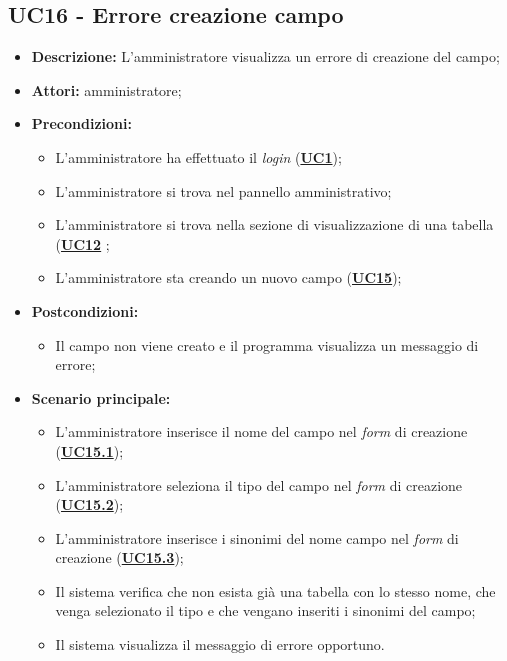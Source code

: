 \subsection{UC16 - Errore creazione campo}
\label{sec:UC16}
\begin{itemize}
	\item \textbf{Descrizione:} L’amministratore visualizza un errore di creazione del campo;
	\item \textbf{Attori:} amministratore;
	\item \textbf{Precondizioni:} 
	\begin{itemize}
		\item L’amministratore ha effettuato il \textit{login} (\hyperref[sec:UC1]{\textbf{UC1}});
		\item L’amministratore si trova nel pannello amministrativo;
		\item L’amministratore si trova nella sezione di visualizzazione di una tabella (\hyperref[sec:UC12]{\textbf{UC12}} ;
		\item L’amministratore sta creando un nuovo campo (\hyperref[sec:UC15]{\textbf{UC15}});
	\end{itemize}
	\item \textbf{Postcondizioni:} 
	\begin{itemize}
		\item Il campo non viene creato e il programma visualizza un messaggio di errore;
	\end{itemize}
	\item \textbf{Scenario principale:} 
	\begin{itemize}
		\item L’amministratore inserisce il nome del campo nel \textit{form} di creazione (\hyperref[sec:UC15.1]{\textbf{UC15.1}});
		\item L’amministratore seleziona il tipo del campo nel \textit{form} di creazione (\hyperref[sec:UC15.2]{\textbf{UC15.2}});
		\item L’amministratore inserisce i sinonimi del nome campo nel \textit{form} di creazione (\hyperref[sec:UC15.3]{\textbf{UC15.3}});
		\item Il sistema verifica che non esista già una tabella con lo stesso nome, che venga selezionato il tipo e che vengano inseriti i sinonimi del campo;
		\item Il sistema visualizza il messaggio di errore opportuno.
	\end{itemize}
\end{itemize}

